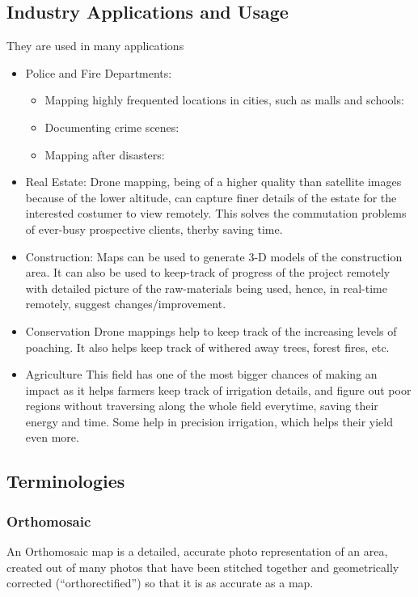 \documentclass[11pt,twocolumn,letterpaper]{article}
\begin{document}
\subsection{Industry Applications and Usage}
They are used in many applications
\begin{itemize}
\item Police and Fire Departments:
\begin{itemize}
\item Mapping highly frequented locations in cities, such as malls and schools:
\item  Documenting crime scenes:
\item  Mapping after disasters:
\end{itemize}
\item  Real Estate:
Drone mapping, being of a higher quality than satellite images because of the lower altitude, can capture finer details of the estate for the interested costumer to view remotely. This solves the commutation problems of ever-busy prospective clients, therby saving time.
\item  Construction:
Maps can be used to generate 3-D models of the construction area. It can also be used to keep-track of progress of the project remotely with detailed picture of the raw-materials being used, hence, in real-time remotely, suggest changes/improvement.
\item Conservation
Drone mappings help to keep track of the increasing levels of poaching. It also helps keep track of withered away trees, forest fires, etc.
\item Agriculture
This field has one of the most bigger chances of making an impact as it helps farmers keep track of irrigation details, and figure out poor regions without traversing along the whole field everytime, saving their energy and time. Some help in precision irrigation, which helps their yield even more.

\end{itemize}


\subsection{Terminologies}
\subsubsection{Orthomosaic}
An Orthomosaic map is a detailed, accurate photo representation of an area, created out of many photos that have been stitched together and geometrically corrected (“orthorectified”) so that it is as accurate as a map.
\end{document}
